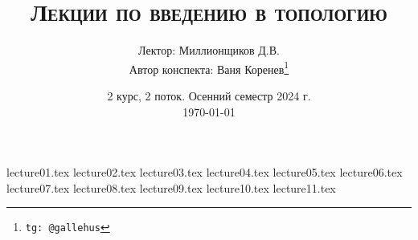 \documentclass[a4paper]{article}
\title{\scshape {Лекции по введению в топологию}}
\date{2 курс, 2 поток. Осенний семестр 2024 г. \\ \today}
\author{Лектор: Миллионщиков Д.В. \\ Автор конспекта: Ваня Коренев\thanks{\texttt{tg: @gallehus}}}
\begin{document}
\maketitle
\newpage
\tableofcontents

\newpage

{lecture01.tex}
{lecture02.tex}
{lecture03.tex}
{lecture04.tex}
{lecture05.tex}
{lecture06.tex}
{lecture07.tex}
{lecture08.tex}
{lecture09.tex}
{lecture10.tex}
{lecture11.tex}
\end{document}
